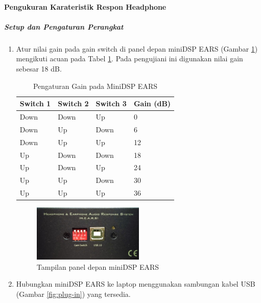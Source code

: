 \documentclass{article}
\begin{document}
	\paragraph{Pengukuran Karateristik Respon Headphone}
	\subparagraph{Setup dan Pengaturan Perangkat}
	\label{setup}
	\begin{enumerate}
		\item Atur nilai gain pada gain switch di panel depan miniDSP EARS (Gambar \ref{fig:front-panel}) mengikuti acuan pada Tabel \ref{table:gain}. Pada pengujiani ini digunakan nilai gain sebesar 18 dB.

		\begin{table}[H]
			\centering
			\caption{Pengaturan Gain pada MiniDSP EARS \label{table:gain}}
			\begin{tabular}{| p{0.1\textwidth} | p{} | p{} | p{} |}
				\hline
				Switch 1 & Switch 2 & Switch 3 & Gain (dB) \\ \hline\hline
				Down & Down & Up & 0 \\ \hline
				Down & Up & Down & 6 \\ \hline
				Down & Up & Up & 12 \\ \hline
				Up & Down & Down & 18 \\ \hline
				Up & Down & Up & 24 \\ \hline
				Up & Up & Down & 30 \\ \hline
				Up & Up & Up & 36 \\ \hline
			\end{tabular}
		\end{table}

		\begin{figure}[H]
			\centering
			\includegraphics[width=0.5\textwidth]{images/front-panel}
			\caption{Tampilan panel depan miniDSP EARS}
			\label{fig:front-panel}
		\end{figure}

		\item Hubungkan miniDSP EARS ke laptop menggunakan sambungan kabel USB (Gambar \ref{fig:plug-in}) yang tersedia.


\end{enumerate}
\end{document}
